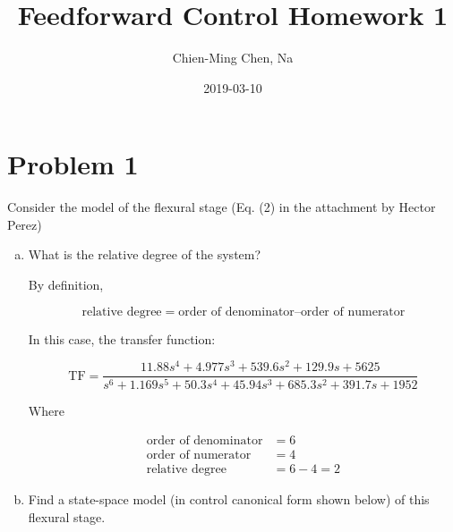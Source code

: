 \documentclass[12pt]{article}
\title{Feedforward Control Homework 1}
\date{2019-03-10}
\author{Chien-Ming Chen, Na}
\begin{document}
  \maketitle

  \section{Problem 1}
  Consider the model of the flexural stage (Eq. (2) in the attachment by Hector Perez)

  \begin{enumerate}[(a)]
    \item What is the relative degree of the system?

    By definition,

    \begin{equation}
      \text{relative degree} = \text{order of denominator} – \text{order of numerator}
    \end{equation}

    In this case, the transfer function:

    \begin{equation}
      \text{TF} = \frac{11.88 s^4 + 4.977 s^3 + 539.6 s^2 + 129.9 s + 5625}{s^6 + 1.169 s^5 + 50.3 s^4 + 45.94 s^3 + 685.3 s^2 + 391.7 s + 1952}
    \end{equation}

    Where

    \begin{align*}
      \text{order of denominator} &= 6 \\
      \text{order of numerator} &= 4 \\
      \text{relative degree} &= 6 - 4 = 2
    \end{align*}

    \clearpage

    \item Find a state-space model (in control canonical form shown below) of this flexural stage.


\end{enumerate}
\end{document}
